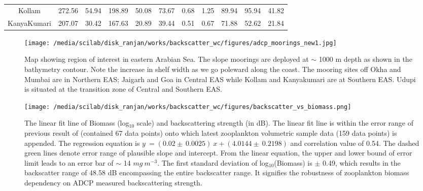 \documentclass{article}
\begin{document}
\begin{table}[t]
{\begin{adjustwidth}{0in}{0in}
\begin{tabular}{ccccccccccc}
	Kollam      & 272.56       & 54.94      & 198.89 & 50.08                    & 73.67                                                                                            & 0.68 & 1.25 & 89.94         & 95.94        & 41.82  \\
	KanyaKumari & 207.07       & 30.42      & 167.63 & 20.89                    & 39.44                                                                                            & 0.51 & 0.67 & 71.88         & 52.62        & 21.84  \\ \hline
\end{tabular}
	\end{adjustwidth}
    \label{tab:table3}
    }
\end{table}

\newpage
\begin{figure}[htbp]
	\centering
	\texttt{[image: /media/scilab/disk\_ranjan/works/backscatter\_wc/figures/adcp\_moorings\_new1.jpg]} 
	\captionsetup{justification=justified,font=footnotesize,skip=0.05\baselineskip,width=0.8\textwidth}
	\caption{Map showing region of interest in eastern Arabian Sea. The slope moorings are
		deployed at $\sim$ 1000 m depth as shown in the bathymetry contour. Note the increase in shelf width as we go poleward along the coast. The mooring sites off Okha and Mumbai are in Northern EAS; Jaigarh and Goa in Central EAS while Kollam and Kanyakumari are at Southern EAS. Udupi is situated at the transition zone of Central and Southern EAS.}
	\label{fig:map}
\end{figure}

\newpage
\begin{figure}[htbp]
	\centering
	\texttt{[image: /media/scilab/disk\_ranjan/works/backscatter\_wc/figures/backscatter\_vs\_biomass.png]} 
	\captionsetup{justification=justified,font=footnotesize,skip=0.05\baselineskip,width=0.8\textwidth}
	\caption{The linear fit line of Biomass (log$_{10}$ scale) and backscattering strength (in dB). The linear fit line is within the error range of previous result of \citep{aparna2022seasonal} (contained 67 data points) onto which latest zooplankton volumetric sample data (159 data points) is appended. The regression equation is $y\ = (0.02 \pm\ 0.0025) \ x + (4.0144 \pm \ 0.2198) $ and correlation value of 0.54. The dashed green lines denote error range of plausible slope and intercept. From the linear equation, the upper and lower bound of error limit leads to an error bar of $\sim$  14 $ mg\ m^{-3}$. The first standard deviation of log$_{10}$(Biomass) is $\pm$ 0.49, which results in the backscatter range of 48.58 dB encompassing the entire backscatter range. It signifies the robustness of zooplankton biomass dependency on ADCP measured backscattering strength.}
	\label{fig:bstobm}
\end{figure}
\end{document}
